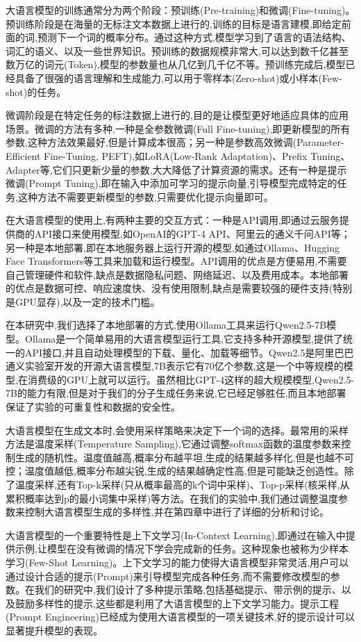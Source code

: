 大语言模型的训练通常分为两个阶段：预训练(Pre-training)和微调(Fine-tuning)。预训练阶段是在海量的无标注文本数据上进行的,训练的目标是语言建模,即给定前面的词,预测下一个词的概率分布\cite{brown2020language}。通过这种方式,模型学习到了语言的语法结构、词汇的语义、以及一些世界知识。预训练的数据规模非常大,可以达到数千亿甚至数万亿的词元(Token),模型的参数量也从几亿到几千亿不等。预训练完成后,模型已经具备了很强的语言理解和生成能力,可以用于零样本(Zero-shot)或小样本(Few-shot)的任务。

微调阶段是在特定任务的标注数据上进行的,目的是让模型更好地适应具体的应用场景。微调的方法有多种,一种是全参数微调(Full Fine-tuning),即更新模型的所有参数,这种方法效果最好,但是计算成本很高；另一种是参数高效微调(Parameter-Efficient Fine-Tuning, PEFT),如LoRA(Low-Rank Adaptation)、Prefix Tuning、Adapter等,它们只更新少量的参数,大大降低了计算资源的需求。还有一种是提示微调(Prompt Tuning),即在输入中添加可学习的提示向量,引导模型完成特定的任务,这种方法不需要更新模型的参数,只需要优化提示向量即可。

在大语言模型的使用上,有两种主要的交互方式：一种是API调用,即通过云服务提供商的API接口来使用模型,如OpenAI的GPT-4 API、阿里云的通义千问API等；另一种是本地部署,即在本地服务器上运行开源的模型,如通过Ollama、Hugging Face Transformers等工具来加载和运行模型。API调用的优点是方便易用,不需要自己管理硬件和软件,缺点是数据隐私问题、网络延迟、以及费用成本。本地部署的优点是数据可控、响应速度快、没有使用限制,缺点是需要较强的硬件支持(特别是GPU显存),以及一定的技术门槛。

在本研究中,我们选择了本地部署的方式,使用Ollama工具来运行Qwen2.5-7B模型。Ollama是一个简单易用的大语言模型运行工具,它支持多种开源模型,提供了统一的API接口,并且自动处理模型的下载、量化、加载等细节。Qwen2.5是阿里巴巴通义实验室开发的开源大语言模型,7B表示它有70亿个参数,这是一个中等规模的模型,在消费级的GPU上就可以运行。虽然相比GPT-4这样的超大规模模型,Qwen2.5-7B的能力有限,但是对于我们的分子生成任务来说,它已经足够胜任,而且本地部署保证了实验的可重复性和数据的安全性。

大语言模型在生成文本时,会使用采样策略来决定下一个词的选择。最常用的采样方法是温度采样(Temperature Sampling),它通过调整softmax函数的温度参数来控制生成的随机性。温度值越高,概率分布越平坦,生成的结果越多样化,但是也越不可控；温度值越低,概率分布越尖锐,生成的结果越确定性高,但是可能缺乏创造性。除了温度采样,还有Top-k采样(只从概率最高的k个词中采样)、Top-p采样(核采样,从累积概率达到p的最小词集中采样)等方法。在我们的实验中,我们通过调整温度参数来控制大语言模型生成的多样性,并在第四章中进行了详细的分析和讨论。

大语言模型的一个重要特性是上下文学习(In-Context Learning),即通过在输入中提供示例,让模型在没有微调的情况下学会完成新的任务。这种现象也被称为少样本学习(Few-Shot Learning)。上下文学习的能力使得大语言模型非常灵活,用户可以通过设计合适的提示(Prompt)来引导模型完成各种任务,而不需要修改模型的参数。在我们的研究中,我们设计了多种提示策略,包括基础提示、带示例的提示、以及鼓励多样性的提示,这些都是利用了大语言模型的上下文学习能力。提示工程(Prompt Engineering)已经成为使用大语言模型的一项关键技术,好的提示设计可以显著提升模型的表现。

